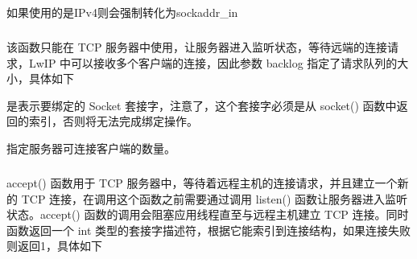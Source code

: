 \documentclass[a4paper,12pt,english]{sphinxmanual}
\begin{document}
{{\sphinxAtStartPar
如果使用的是IPv4则会强制转化为sockaddr\_in

\begin{sphinxVerbatim}[commandchars=\\\{\}]
\end{sphinxVerbatim}


\subparagraph{}
\label{\detokenize{exp-esp32/socket/tcp:listen}}
\sphinxAtStartPar
该函数只能在 TCP 服务器中使用，让服务器进入监听状态，等待远端的连接请求，LwIP 中可以接收多个客户端的连接，因此参数 backlog 指定了请求队列的大小，具体如下

\begin{sphinxVerbatim}[commandchars=\\\{\}]
\end{sphinxVerbatim}

\sphinxAtStartPar
{} 是表示要绑定的 Socket 套接字，注意了，这个套接字必须是从 socket() 函数中返回的索引，否则将无法完成绑定操作。

\sphinxAtStartPar
{}指定服务器可连接客户端的数量。


\subparagraph{}
\label{\detokenize{exp-esp32/socket/tcp:accept}}
\sphinxAtStartPar
accept() 函数用于 TCP 服务器中，等待着远程主机的连接请求，并且建立一个新的 TCP 连接，在调用这个函数之前需要通过调用 listen() 函数让服务器进入监听状态。accept() 函数的调用会阻塞应用线程直至与远程主机建立 TCP 连接。同时函数返回一个 int 类型的套接字描述符，根据它能索引到连接结构，如果连接失败则返回\sphinxhyphen{}1，具体如下

\begin{sphinxVerbatim}[commandchars=\\\{\}]
\end{sphinxVerbatim}

}}
\end{document}
